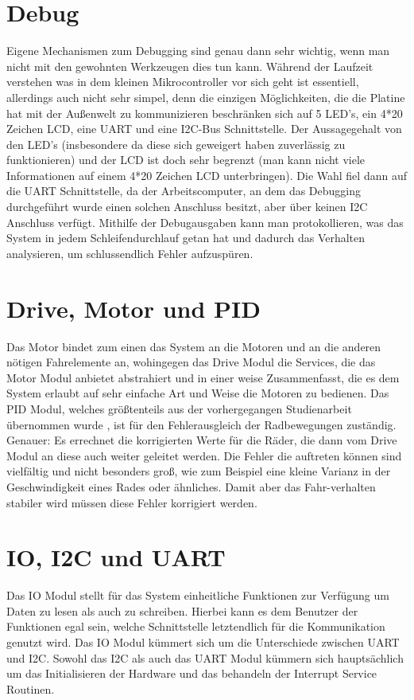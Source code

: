 \section{Debug}
Eigene Mechanismen zum Debugging sind genau dann sehr wichtig, wenn man nicht mit den
gewohnten Werkzeugen dies tun kann. Während der Laufzeit verstehen was in dem kleinen
Mikrocontroller vor sich geht ist essentiell, allerdings auch nicht sehr simpel, denn
die einzigen Möglichkeiten, die die Platine hat mit der Außenwelt zu kommunizieren
beschränken sich auf 5 LED's, ein 4*20 Zeichen LCD, eine UART und eine I2C-Bus 
Schnittstelle. Der Aussagegehalt von den LED's (insbesondere da diese sich geweigert
haben zuverlässig zu funktionieren) und der LCD ist doch sehr begrenzt (man kann nicht
viele Informationen auf einem 4*20 Zeichen LCD unterbringen). Die Wahl fiel dann auf
die UART Schnittstelle, da der Arbeitscomputer, an dem das Debugging durchgeführt wurde
einen solchen Anschluss besitzt, aber über keinen I2C Anschluss verfügt.
Mithilfe der Debugausgaben kann man protokollieren, was das System in jedem
Schleifendurchlauf getan hat und dadurch das Verhalten analysieren, um schlussendlich
Fehler aufzuspüren. 
\section{Drive, Motor und PID}
Das Motor bindet zum einen das System an die Motoren und an die anderen nötigen
Fahrelemente an, wohingegen das Drive Modul die Services, die das Motor Modul anbietet
abstrahiert und in einer weise Zusammenfasst, die es dem System erlaubt auf sehr einfache
Art und Weise die Motoren zu bedienen.
Das PID Modul, welches größtenteils aus der vorhergegangen Studienarbeit übernommen wurde
\cite{STUD_TIMO}, ist für den Fehlerausgleich der Radbewegungen zuständig. Genauer: Es
errechnet die korrigierten Werte für die Räder, die dann vom Drive Modul an diese auch
weiter geleitet werden. Die Fehler die auftreten können sind vielfältig und nicht besonders
groß, wie zum Beispiel eine kleine Varianz in der Geschwindigkeit eines Rades oder ähnliches.
Damit aber das Fahr-verhalten stabiler wird müssen diese Fehler korrigiert werden.
\section{IO, I2C und UART}
Das IO Modul stellt für das System einheitliche Funktionen zur Verfügung um Daten zu lesen als
auch zu schreiben. Hierbei kann es dem Benutzer der Funktionen egal sein, welche Schnittstelle
letztendlich für die Kommunikation genutzt wird. Das IO Modul kümmert sich um die Unterschiede
zwischen UART und I2C.
Sowohl das I2C als auch das UART Modul kümmern sich hauptsächlich um das Initialisieren der
Hardware und das behandeln der Interrupt Service Routinen.
